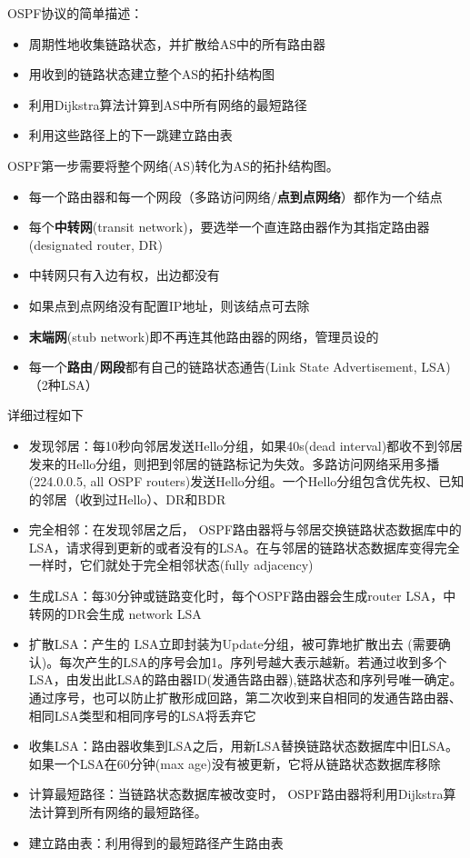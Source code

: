 OSPF协议的简单描述：
\begin{itemize}
\item 周期性地收集链路状态，并扩散给AS中的所有路由器
\item 用收到的链路状态建立整个AS的拓扑结构图
\item 利用Dijkstra算法计算到AS中所有网络的最短路径
\item 利用这些路径上的下一跳建立路由表
\end{itemize}

OSPF第一步需要将整个网络(AS)转化为AS的拓扑结构图。
\begin{itemize}
	\item 每一个路由器和每一个网段（多路访问网络/\textbf{点到点网络}）都作为一个结点
	\item 每个\textbf{中转网}(transit network)，要选举一个直连路由器作为其指定路由器(designated router, DR)
	\item 中转网只有入边有权，出边都没有
	\item 如果点到点网络没有配置IP地址，则该结点可去除
	\item \textbf{末端网}(stub network)即不再连其他路由器的网络，管理员设的
	\item 每一个\textbf{路由/网段}都有自己的链路状态通告(Link State Advertisement, LSA)（2种LSA）
\end{itemize}

详细过程如下
\begin{itemize}
	\item 发现邻居：每10秒向邻居发送Hello分组，如果40s(dead interval)都收不到邻居发来的Hello分组，则把到邻居的链路标记为失效。多路访问网络采用多播(224.0.0.5, all OSPF routers)发送Hello分组。一个Hello分组包含优先权、已知的邻居（收到过Hello）、DR和BDR
	\item 完全相邻：在发现邻居之后， OSPF路由器将与邻居交换链路状态数据库中的LSA，请求得到更新的或者没有的LSA。在与邻居的链路状态数据库变得完全一样时，它们就处于完全相邻状态(fully adjacency)
	\item 生成LSA：每30分钟或链路变化时，每个OSPF路由器会生成router LSA，中转网的DR会生成	network LSA
	\item 扩散LSA：产生的 LSA立即封装为Update分组，被可靠地扩散出去 (需要确认)。每次产生的LSA的序号会加1。序列号越大表示越新。若通过收到多个LSA，由发出此LSA的路由器ID(发通告路由器),链路状态和序列号唯一确定。通过序号，也可以防止扩散形成回路，第二次收到来自相同的发通告路由器、相同LSA类型和相同序号的LSA将丢弃它
	\item 收集LSA：路由器收集到LSA之后，用新LSA替换链路状态数据库中旧LSA。如果一个LSA在60分钟(max age)没有被更新，它将从链路状态数据库移除
	\item 计算最短路径：当链路状态数据库被改变时， OSPF路由器将利用Dijkstra算法计算到所有网络的最短路径。
	\item 建立路由表：利用得到的最短路径产生路由表
\end{itemize}


